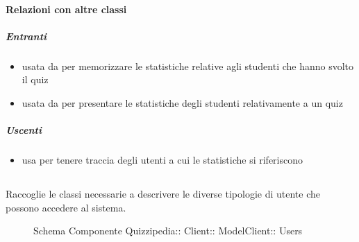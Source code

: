 \paragraph{Relazioni con altre classi}
\subparagraph{Entranti}
\begin{itemize}
\item usata da  per memorizzare le statistiche relative agli studenti che hanno svolto il quiz
\item usata da  per presentare le statistiche degli studenti relativamente a un quiz
\end{itemize}
\subparagraph{Uscenti}
\begin{itemize}
\item usa  per tenere traccia degli utenti a cui le statistiche si riferiscono
\end{itemize}
\subsection{}
Raccoglie le classi necessarie a descrivere le diverse tipologie di utente che possono accedere al sistema.
\begin{figure}[H]
\centering
\noindent{}
\caption[Schema Componente Users]{Schema Componente Quizzipedia:: Client:: ModelClient:: Users}
\end{figure}
